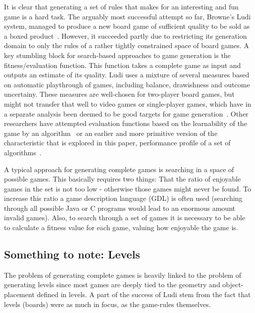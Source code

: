 \documentclass[a4paper,titlepage,final]{report}
\begin{document}
It is clear that generating a set of rules that makes for an interesting and fun game is a hard task. 
The arguably most successful attempt so far, Browne's Ludi system, managed to produce a new board game of sufficient quality to be sold as a boxed product~\citet{browne2008automated}. 
However, it succeeded partly due to restricting its generation domain to only the rules of a rather tightly constrained space of board games. 
A key stumbling block for search-based approaches to game generation is the fitness/evaluation function. 
This function takes a complete game as input and outputs an estimate of its quality. Ludi uses a mixture of several measures based on automatic playthrough of games, including balance, drawishness and outcome uncertainy.
These measures are well-chosen for two-player board games, but might not transfer that well to video games or single-player games, which have in a separate analysis been deemed to be good targets for game generation~\citet{togelius2014characteristics}. 
Other researchers have attempted evaluation functions based on the learnability of the game by an algorithm~\citet{togelius2008experiment} or an earlier and more primitive version of the characteristic that is explored in this paper, performance profile of a set of algorithms~\citet{font2013towards}.

A typical approach for generating complete games is searching in a space of possible games. This basically requires two things: That the ratio of enjoyable games in the set is not too low - otherwise those games might never be found. To increase this ratio a game description language (GDL) is often used (searching through all possible Java or C programs would lead to an enormous amount invalid games).
Also, to search through a set of games it is necessary to be able to calculate a fitness value for each game, valuing how enjoyable the game is.


\subsection{Something to note: Levels}
\label{ssec_notelevels}
The problem of generating complete games is heavily linked to the problem of generating levels since most games are deeply tied to the geometry and object-placement defined in levels.
A part of the success of Ludi stem from the fact that levels (boards) were as much in focus, as the game-rules themselves.
\end{document}
